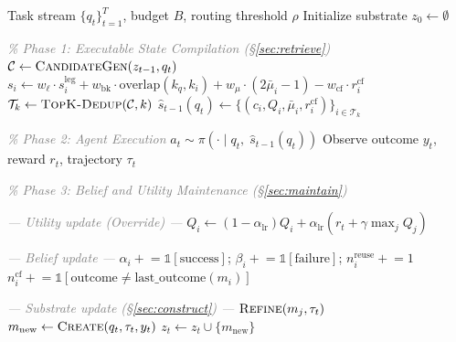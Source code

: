 \begin{algorithm}[t]
\caption{Budgeted Adaptive State Tracking}
\label{alg:main}
\begin{algorithmic}[1]
\Require Task stream $\{q_t\}_{t=1}^T$, budget $B$, routing threshold $\rho$
\State Initialize substrate $z_0 \leftarrow \emptyset$


  \Statex \hspace{\algorithmicindent}\textcolor{gray}{\textit{\% Phase 1: Executable State Compilation (\S\ref{sec:retrieve})}}
  \State $\mathcal{C} \leftarrow \textsc{CandidateGen}(z_{t-1}, q_t)$ 
    \State $s_i \leftarrow w_\ell \cdot s_i^{\mathrm{leg}} + w_{\mathrm{bk}} \cdot \mathrm{overlap}(k_q, k_i) + w_\mu \cdot (2\bar{\mu}_i{-}1) - w_{\mathrm{cf}} \cdot r_i^{\mathrm{cf}}$
  \EndFor
  \State $\mathcal{T}_k \leftarrow \textsc{TopK-Dedup}(\mathcal{C}, k)$ 
  \State $\hat{s}_{t-1}(q_t) \leftarrow \bigl\{(c_i, Q_i, \bar{\mu}_i, r_i^{\mathrm{cf}})\bigr\}_{i \in \mathcal{T}_k}$

  \Statex \hspace{\algorithmicindent}\textcolor{gray}{\textit{\% Phase 2: Agent Execution}}
  \State $a_t \sim \pi(\cdot \mid q_t,\; \hat{s}_{t-1}(q_t))$
  \State Observe outcome $y_t$, reward $r_t$, trajectory $\tau_t$

  \Statex \hspace{\algorithmicindent}\textcolor{gray}{\textit{\% Phase 3: Belief and Utility Maintenance (\S\ref{sec:maintain})}}

  \Statex \hspace{\algorithmicindent}\textcolor{gray}{\textit{--- Utility update (Override) ---}}
    \State $Q_i \leftarrow (1{-}\alpha_{\mathrm{lr}}) Q_i + \alpha_{\mathrm{lr}}(r_t + \gamma \max_j Q_j)$ 
  \EndFor

  \Statex \hspace{\algorithmicindent}\textcolor{gray}{\textit{--- Belief update ---}}
    \State $\alpha_i \mathrel{+}= \mathbb{1}[\text{success}]$;\; $\beta_i \mathrel{+}= \mathbb{1}[\text{failure}]$;\; $n_i^{\mathrm{reuse}} \mathrel{+}= 1$ 
    \State $n_i^{\mathrm{cf}} \mathrel{+}= \mathbb{1}[\text{outcome} \neq \text{last\_outcome}(m_i)]$
  \EndFor

  \Statex \hspace{\algorithmicindent}\textcolor{gray}{\textit{--- Substrate update (\S\ref{sec:construct}) ---}}
    \State $\textsc{Refine}(m_j, \tau_t)$ 
  \Else
    \State $m_{\mathrm{new}} \leftarrow \textsc{Create}(q_t, \tau_t, y_t)$ 
    \State $z_t \leftarrow z_t \cup \{m_{\mathrm{new}}\}$
  \EndIf


\end{algorithmic}
\end{algorithm}
